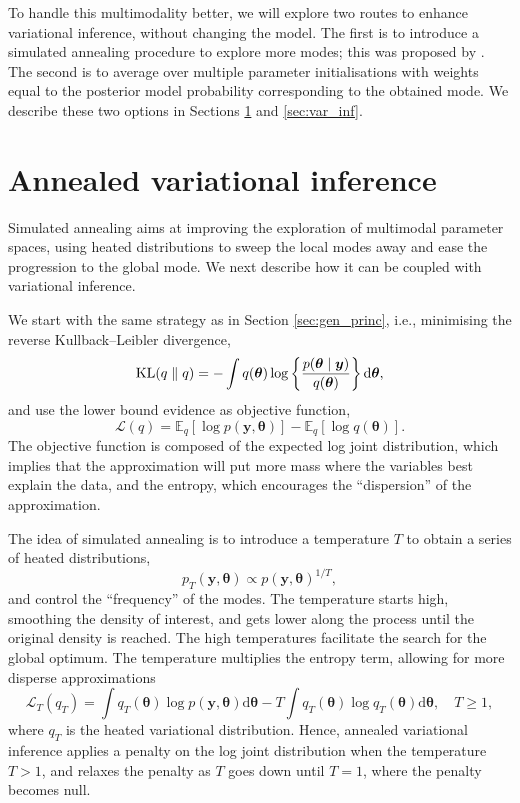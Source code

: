 \documentclass[a4paper, 11pt]{report}
\numberwithin{equation}{chapter}
\DeclareMathOperator*{\KL}{{\rm KL}}
\begin{document}
To handle this multimodality better, we will explore two routes to enhance variational inference, without changing the model. The first is to introduce a simulated annealing procedure to explore more modes; this was proposed by \citet{glob_loc}. The second is to average over multiple parameter initialisations with weights equal to the posterior model probability corresponding to the obtained mode. We describe these two options in Sections \ref{sec:ann} and \ref{sec:var_inf}.
\section{Annealed variational inference} \label{sec:ann}
Simulated annealing aims at improving the exploration of multimodal parameter spaces, using heated distributions to sweep the local modes away and ease the progression to the global mode. We next describe how it can be coupled with variational inference.

We start with the same strategy as in Section \ref{sec:gen_princ}, i.e., minimising the reverse Kullback--Leibler divergence,
\begin{equation*}
\KL(q \parallel q) = -\int q(\boldsymbol{\theta}) \log\left\lbrace\frac{p(\boldsymbol{\theta}\mid\boldsymbol{y})}{q(\boldsymbol{\theta})}\right\rbrace \mathrm{d}\boldsymbol{\theta},
\end{equation*}
and use the lower bound evidence as objective function,
\begin{equation*}
\mathcal{L}(q) = \mathbb{E}_q\left[ \log p(\boldsymbol{y}, \boldsymbol{\theta})\right] - \mathbb{E}_q\left[\log q(\boldsymbol{\theta})\right].
\end{equation*}
The objective function is composed of the expected log joint distribution, which implies that the approximation will put more mass where the variables best explain the data, and the entropy, which encourages the ``dispersion'' of the approximation. 

The idea of simulated annealing is to introduce a temperature $T$ to obtain a series of heated distributions,
\begin{equation*}
p_T(\boldsymbol{y},\boldsymbol{\theta}) \propto p(\boldsymbol{y},\boldsymbol{\theta})^{1/T},
\end{equation*}
and control the ``frequency'' of the modes. The temperature starts high, smoothing the density of interest, and gets lower along the process until the original density is reached. The high temperatures facilitate the search for the global optimum. The temperature multiplies the entropy term, allowing for more disperse approximations
\begin{equation}
\mathcal{L}_T(q_T) = \int q_T(\boldsymbol{\theta}) \log p(\boldsymbol{y},\boldsymbol{\theta})\mathrm{d}\boldsymbol{\theta} - T \int q_T(\boldsymbol{\theta}) \log q_T(\boldsymbol{\theta}) \mathrm{d}\boldsymbol{\theta},\quad T\geq 1,
\label{eq:ann_elbo}
\end{equation}
where $q_T$ is the heated variational distribution. Hence, annealed variational inference applies a penalty on the log joint distribution when the temperature $T > 1$, and relaxes the penalty as $T$ goes down until $T = 1$, where the penalty becomes null.
\end{document}
